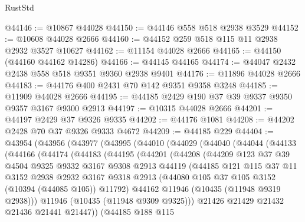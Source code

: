 \begin{lexlean}{RustStd}
\begin{coremodule}
@44146 := @10867 @44028
@44150 := @44146 @558 @518 @2938 @3529
@44152 := @10608 @44028 @2666
@44160 := @44152 @259 @518 @115 @11 @2938 @2932 @3527 @10627
@44162 := @11154 @44028 @2666
@44165 := @44150 (@44160 @44162 @14286)
@44166 := @44145 @44165
@44174 := @44047 @2432 @2438 @558 @518 @9351 @9360 @2938 @9401
@44176 := @11896 @44028 @2666
@44183 := @44176 @400 @2431 @70 @142 @9351 @9358 @3248
@44185 := @11909 @44028 @2666
@44195 := @44185 @2429 @190 @37 @39 @9337 @9350 @9357 @3167 @9300 @2913
@44197 := @10315 @44028 @2666
@44201 := @44197 @2429 @37 @9326 @9335
@44202 := @44176 @1081
@44208 := @44202 @2428 @70 @37 @9326 @9333 @4672
@44209 := @44185 @229
@44404 := @43954
    (@43956
      (@43977
        (@43995
          (@44010
            (@44029
              (@44040
                (@44044
                  (@44133
                    (@44166
                      (@44174
                        (@44183
                          (@44195
                            (@44201
                              (@44208
                                (@44209
                                  @123
                                  @37
                                  @39
                                  @4504
                                  @9325
                                  @9332
                                  @3167
                                  @9308
                                  @2913
                                  @44119
                                  (@44185
                                    @121
                                    @115
                                    @37
                                    @11
                                    @3152
                                    @2938
                                    @2932
                                    @3167
                                    @9318
                                    @2913
                                    (@44080 @105 @37 @105 @3152 (@10394 (@44085 @105)) @11792)
                                    @44162
                                    @11946
                                    (@10435 (@11948 @9319 @2938)))
                                  @11946
                                  (@10435 (@11948 @9309 @9325)))
                                @21426
                                @21429
                                @21432
                                @21436
                                @21441
                                @21447))
                            (@44185
                              @188
                              @115

\end{coremodule}
\end{lexlean}
